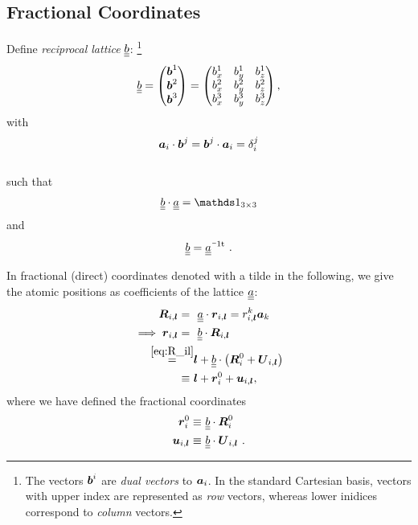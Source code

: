 \subsection{Fractional Coordinates}
\nid
Define \emph{reciprocal lattice} $\underline{\underline{{b}}}$:
\footnote{The vectors $\boldsymbol{b}^i$ are \emph{dual vectors} to $\boldsymbol{a}_i$. In the 
standard Cartesian basis, vectors with upper index are represented as 
\emph{row} vectors, whereas lower inidices correspond to \emph{column} vectors.}
\begin{align}
	\underline{\underline{{b}}}
	= \begin{pmatrix}
	\boldsymbol{b}^1 \\ \boldsymbol{b}^2 \\ \boldsymbol{b}^3
	\end{pmatrix}
	= \begin{pmatrix}
	b^1_x & b^1_y & b^1_z \\
	b^2_x & b^2_y & b^2_z \\
	b^3_x & b^3_y & b^3_z
	\end{pmatrix}
	,
\end{align}
with
$$ \boldsymbol{a}_i \cdot \boldsymbol{b}^j = \boldsymbol{b}^j \cdot \boldsymbol{a}_i = \delta_i^j $$
 \\
such that
\begin{align}
	\uunderline{b} \cdot \uunderline{a} = \id_{3 \times 3}
\end{align}
and
\begin{align}
	\uunderline{b} = \itp{\uunderline{a}}
	~.
\end{align}

In fractional (direct) coordinates denoted with a tilde in the 
following, we 
give the atomic positions as 
coefficients of the lattice $\underline{\underline{{a}}}$:
\begin{align}
\boldsymbol{R}_{i, \boldsymbol{l}} 
=~& ~ \underline{\underline{{a}}} \cdot \boldsymbol{r}_{i, \boldsymbol{l}} = r_{i, \boldsymbol{l}}^k \boldsymbol{a}_k \\
	\implies \boldsymbol{r}_{i, \boldsymbol{l}} =~& ~\underline{\underline{{b}}} \cdot \boldsymbol{R}_{i, \boldsymbol{l}} \\
	\stackrel{\eqref{eq:R_il}}{=}&
	\boldsymbol{l} + \underline{\underline{{b}}} \cdot \left(\boldsymbol{R}^0_{i} +  \boldsymbol{U}_{i, \boldsymbol{l}}\right) \\
	\equiv~& \boldsymbol{l} + \boldsymbol{r}_i^0 + \boldsymbol{u}_{i, \boldsymbol{l}}, 
\end{align}
where we have defined the fractional coordinates
\begin{align}
	\begin{split}
	\boldsymbol{r}_i^0 \equiv & ~\underline{\underline{{b}}} \cdot \boldsymbol{R}^0_{i} \\
	\boldsymbol{u}_{i, \boldsymbol{l}} \equiv & ~\underline{\underline{{b}}} \cdot \boldsymbol{U}_{i, \boldsymbol{l}}~.
	\end{split}
	\label{eq:ru_frac}
\end{align}

